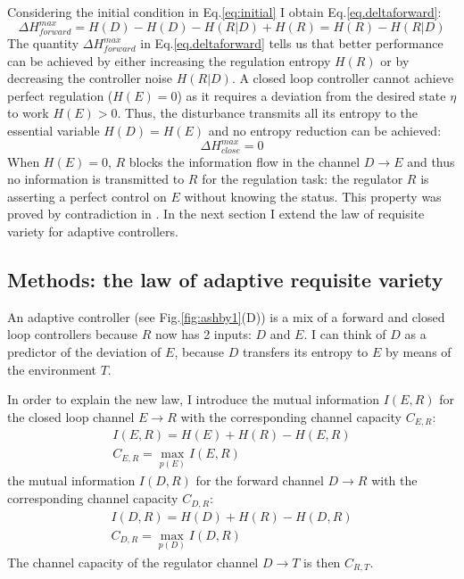 Considering the initial condition in Eq.\ref{eq:initial} I obtain Eq.\ref{eq.deltaforward}:
\begin{equation}
\Delta H^{max}_{forward}=H(D)-H(D)-H(R|D)+H(R)=H(R)-H(R|D)
\end{equation}
The quantity $\Delta H^{max}_{forward}$ in Eq.\ref{eq.deltaforward} tells us that
better performance can be achieved by either increasing the regulation entropy
$H(R)$ or by decreasing the controller noise $H(R|D)$.
A closed loop controller cannot achieve perfect regulation ($H(E)=0$) as it requires
a deviation from the desired state $\eta$ to work $H(E)>0$.
Thus, the disturbance transmits all its entropy to the essential variable $H(D)=H(E)$
and no entropy reduction can be achieved:
\begin{equation}
\Delta H^{max}_{close}=0\label{eq.deltaclosed}
\end{equation}
When $H(E)=0$, $R$ blocks the information flow in the channel $D\rightarrow E$
and thus no information is transmitted to $R$ for the regulation task: the regulator $R$
is asserting a perfect control on $E$ without knowing the status.
This property was proved by contradiction in \citet{Ashby1956:IntroCybernetics}.
In the next section I extend the law of requisite variety for adaptive controllers.

\subsection{Methods: the law of adaptive requisite variety}
An adaptive controller (see Fig.\ref{fig:ashby1}(D)) is a mix of a forward
\citep{feed-forward} and closed loop controllers \citep{PID} because $R$ now has
2 inputs: $D$ and $E$. I can think of $D$ as a predictor of the deviation
of $E$, because $D$ transfers its entropy to $E$ by means of the environment $T$.

In order to explain the new law, I introduce the mutual information $I(E,R)$
for the closed loop channel $E\rightarrow R$ with the corresponding channel
capacity $C_{E,R}$:
\begin{eqnarray}
I(E,R)=H(E)+H(R)-H(E,R)\\
C_{E,R}=\max_{p(E)} I(E,R)
\end{eqnarray}
the mutual information $I(D,R)$ for the forward channel $D\rightarrow R$ with the
corresponding channel capacity $C_{D,R}$:
\begin{eqnarray}
I(D,R)=H(D)+H(R)-H(D,R)\\
C_{D,R}=\max_{p(D)} I(D,R)
\end{eqnarray}
The channel capacity of the regulator channel $D \rightarrow T$ is then $C_{R,T}$.

